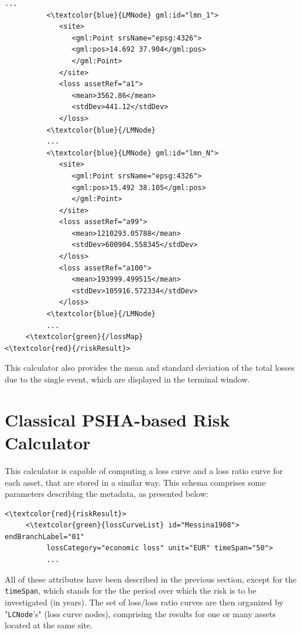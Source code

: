 \begin{Verbatim}[frame=single, commandchars=\\\{\}, samepage=true]
          ...
          <\textcolor{blue}{LMNode} gml:id="lmn_1">
             <site>
                <gml:Point srsName="epsg:4326">
                <gml:pos>14.692 37.904</gml:pos>
                </gml:Point>
             </site>
             <loss assetRef="a1">
                <mean>3562.86</mean>
                <stdDev>441.12</stdDev>
             </loss>
          <\textcolor{blue}{/LMNode} 
          ...
          <\textcolor{blue}{LMNode} gml:id="lmn_N">
             <site>
                <gml:Point srsName="epsg:4326">
                <gml:pos>15.492 38.105</gml:pos>
                </gml:Point>
             </site>
             <loss assetRef="a99">
                <mean>1210293.05788</mean>
                <stdDev>600904.558345</stdDev>
             </loss>
             <loss assetRef="a100">
                <mean>193999.499515</mean>
                <stdDev>105916.572334</stdDev>
             </loss>
          <\textcolor{blue}{/LMNode} 
          ...
     <\textcolor{green}{/lossMap}
<\textcolor{red}{/riskResult}>      
\end{Verbatim}

This calculator also provides the mean and standard deviation of the total losses due to the single event, which are displayed in the terminal window.

\section{Classical PSHA-based Risk Calculator}
This calculator is capable of computing a loss curve and a loss ratio curve for each asset, that are stored in a similar way. This schema comprises some parameters describing the metadata, as presented below:

\begin{Verbatim}[frame=single, commandchars=\\\{\}, samepage=true]
<\textcolor{red}{riskResult}>
     <\textcolor{green}{lossCurveList} id="Messina1908"> endBranchLabel="01" 
          lossCategory="economic loss" unit="EUR" timeSpan="50">
          ...
\end{Verbatim}

All of these attributes have been described in the previous section, except for the \Verb+timeSpan+, which stands for the the period over which the risk is to be investigated (in years). The set of loss/loss ratio curves are then organized by "\Verb+LCNode+'s" (loss curve nodes), comprising the results for one or many assets located at the same site.

